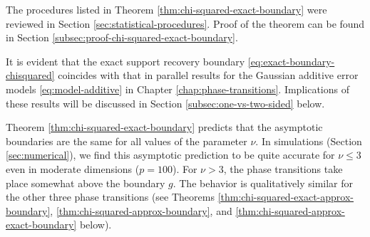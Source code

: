 

The procedures listed in Theorem \ref{thm:chi-squared-exact-boundary} were reviewed in Section \ref{sec:statistical-procedures}. 
Proof of the theorem can be found in Section \ref{subsec:proof-chi-squared-exact-boundary}. 

It is evident that the exact support recovery boundary \eqref{eq:exact-boundary-chisquared} coincides with that in parallel results for the Gaussian additive error models \eqref{eq:model-additive} in Chapter \ref{chap:phase-transitions}.
Implications of these results will be discussed in Section \ref{subsec:one-vs-two-sided} below.

\begin{remark} \label{rmk:strong-classification-boundary-2}
Theorem \ref{thm:chi-squared-exact-boundary} predicts that the asymptotic boundaries are the same for all values of the parameter $\nu$.
In simulations (Section \ref{sec:numerical}), we find this asymptotic prediction to be quite accurate for $\nu\le3$ even in moderate dimensions ($p=100$). 
For $\nu>3$, the phase transitions take place somewhat above the boundary ${g}$.
The behavior is qualitatively similar for the other three phase transitions (see Theorems \ref{thm:chi-squared-exact-approx-boundary}, \ref{thm:chi-squared-approx-boundary}, and \ref{thm:chi-squared-approx-exact-boundary} below).
\end{remark}

